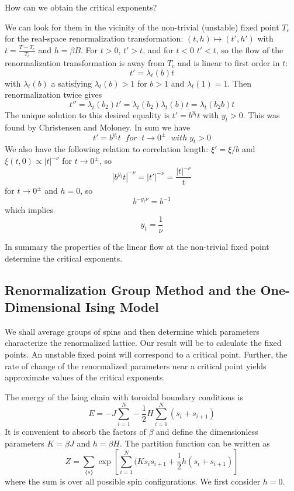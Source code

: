 \documentclass[12pt, a4paper, oneside, openright, titlepage]{book}
\begin{document}
\begin{qst}
    How can we obtain the critical exponents?
\end{qst}
We can look for them in the vicinity of the non-trivial (unstable) fixed point $T_c$ for the real-space renormalization transformation: $(t,h)\mapsto (t',h')$ with $t = \frac{T-T_c}{T_c}$ and $h = \beta B$. For $t > 0$, $t' > t$, and for $t < 0$ $t' < t$, so the flow of the renormalization transformation is away from $T_c$ and is linear to first order in $t$: $$t' = \lambda_t(b)t$$ with $\lambda_t(b)$ a  satisfying $\lambda_t(b) > 1$ for $b > 1$ and $\lambda_t(1) =1$. Then renormalization twice gives \begin{equation*}
    \boxed{t'' = \lambda_t(b_2)t' = \lambda_t(b_2)\lambda_t(b)t = \lambda_t(b_2b)t}
\end{equation*}
The unique solution to this desired equality is $t' = b^{y_t}t$ with $y_t > 0$. This was found by Christensen and Moloney. In sum we have $$\boxed{t' = b^{y_t}t \;\;for\;\;t\rightarrow 0^{\pm}\;\;with\;y_t > 0}$$
We also have the following relation to correlation length: $\xi' = \xi/b$ and $\xi(t,0) \propto |t|^{-\nu}$ for $t\rightarrow 0^{\pm}$, so $$|b^{y_t}t|^{-\nu} = |t'|^{-\nu} = \frac{|t|^{-\nu}}{t}$$ for $t\rightarrow 0^{\pm}$ and $h = 0$, so $$b^{-y_t\nu} = b^{-1}$$ which implies $$\boxed{y_t = \frac{1}{\nu}}$$

\begin{rmk}
    In summary the properties of the linear flow at the non-trivial fixed point determine the critical exponents.
\end{rmk}




\subsection{Renormalization Group Method and the One-Dimensional Ising Model}

We shall average groups of spins and then determine which parameters characterize the renormalized lattice. Our result will be to calculate the fixed points. An unstable fixed point will correspond to a critical point. Further, the rate of change of the renormalized parameters near a critical point yields approximate values of the critical exponents.

The energy of the Ising chain with toroidal boundary conditions is \begin{equation*}
    E = -J\sum_{i=1}^N-\frac{1}{2}H\sum_{i=1}^N(s_i+s_{i+1})
\end{equation*}
It is convenient to absorb the factors of $\beta$ and define the dimensionless parameters $K = \beta J$ and $h = \beta H$. The partition function can be written as \begin{equation*}
    Z = \sum_{\{s\}}\exp\left[\sum_{i=1}^N(Ks_is_{i+1}+\frac{1}{2}h(s_i+s_{i+1})\right]
\end{equation*}
where the sum is over all possible spin configurations. We first consider $h = 0$.
\end{document}
